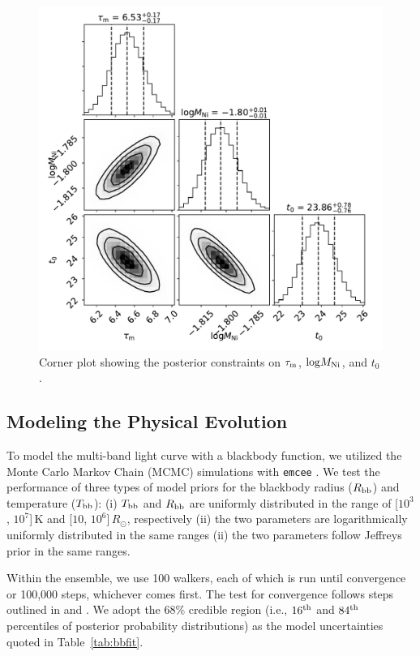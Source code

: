 \documentclass[twocolumn]{aastex63}
\begin{document}


\begin{figure}[htbp!]
	\centering
	\includegraphics[width=\columnwidth]{figures/corner_arnett_modified_all.pdf}
	\caption{Corner plot showing the posterior constraints on $\tau_{\rm m}$, ${\rm log}M_{\rm 
			Ni}$, and $t_0$. \label{fig:Nidecaycorner}}
\end{figure}
\subsection{Modeling the Physical Evolution} \label{subsec:bbfit}
To model the multi-band light curve with a blackbody function, we utilized the Monte Carlo Markov 
Chain (MCMC) simulations with \texttt{emcee} \citep{Foreman-Mackey2013}. We test the performance 
of three types of model priors for 
the blackbody radius ($R_{\rm bb}$) and temperature ($T_{\rm bb}$): (i) $T_{\rm bb}$ 
and $R_{\rm bb}$ are uniformly distributed in the range of [$10^3$, $10^7$]\,K and [$10$, 
$10^6$]\,$R_\odot$, respectively (ii) the two parameters are logarithmically uniformly 
distributed in the same ranges (ii) the two parameters follow Jeffreys prior \citep{jeffreys1946invariant} 
in the same ranges.

Within the ensemble, we use 100 walkers, each of which is run until convergence or 100,000 steps, 
whichever comes first. The test for convergence follows steps outlined in \citet{Yao2019} and 
\citet{Miller2020}. We adopt the 68\% credible region (i.e., $16^{\rm th}$ and $84^{\rm th}$ percentiles 
of posterior probability distributions) as the model uncertainties quoted in Table~\ref{tab:bbfit}.
\end{document}
